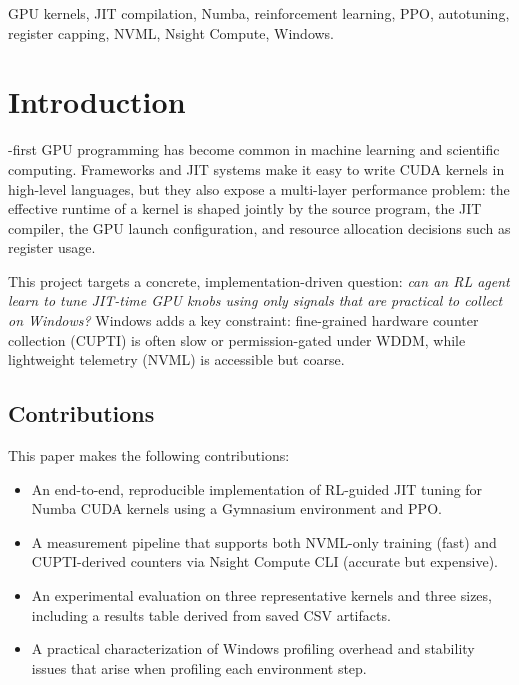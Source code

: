 \documentclass[journal,letterpaper]{IEEEtran}
\begin{document}
\begin{IEEEkeywords}
GPU kernels, JIT compilation, Numba, reinforcement learning, PPO, autotuning, register capping, NVML, Nsight Compute, Windows.
\end{IEEEkeywords}

\section{Introduction}
\label{sec:intro}

-first GPU programming has become common in machine learning and scientific computing.
Frameworks and JIT systems make it easy to write CUDA kernels in high-level languages, but they also expose a multi-layer performance problem: the effective runtime of a kernel is shaped jointly by the source program, the JIT compiler, the GPU launch configuration, and resource allocation decisions such as register usage.

This project targets a concrete, implementation-driven question: \emph{can an RL agent learn to tune JIT-time GPU knobs using only signals that are practical to collect on Windows?}
Windows adds a key constraint: fine-grained hardware counter collection (CUPTI) is often slow or permission-gated under WDDM, while lightweight telemetry (NVML) is accessible but coarse.

\subsection{Contributions}
This paper makes the following contributions:
\begin{itemize}
\item An end-to-end, reproducible implementation of RL-guided JIT tuning for Numba CUDA kernels using a Gymnasium environment and PPO.
\item A measurement pipeline that supports both NVML-only training (fast) and CUPTI-derived counters via Nsight Compute CLI (accurate but expensive).
\item An experimental evaluation on three representative kernels and three sizes, including a results table derived from saved CSV artifacts.
\item A practical characterization of Windows profiling overhead and stability issues that arise when profiling each environment step.
\end{itemize}
\end{document}
